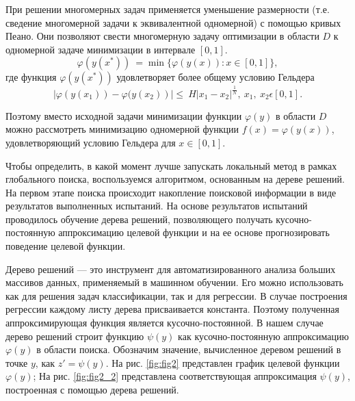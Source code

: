\documentclass[runningheads]{llncs}
\begin{document}
При решении многомерных задач применяется уменьшение размерности (т.е. сведение многомерной задачи к эквивалентной одномерной) с помощью кривых Пеано. Они позволяют свести многомерную задачу оптимизации в области $D$ к одномерной задаче минимизации в интервале $[0, 1]$.
\begin{displaymath}
	\varphi(y(x^\ast))\ =\min\{\varphi(y(x)): x\in [0,1]\},
\end{displaymath}
где функция $\varphi(y(x^\ast))$ удовлетворяет более общему условию Гельдера
\begin{displaymath}
	\left|\varphi (y \left(x_1\right))- \varphi (y \left(x_2\right)\right )|\le\ H\left|x_1-x_2\right|^\frac{1}{N},\ x_1,\ x_2\epsilon[0,1].
\end{displaymath} 

Поэтому вместо исходной задачи минимизации функции $\varphi(y)$ в области $D$ можно рассмотреть минимизацию одномерной функции $f(x)=\varphi(y(x)) $, удовлетворяющий условию Гельдера для $ x\in [0,1]$.


Чтобы определить, в какой момент лучше запускать локальный метод в рамках глобального поиска, воспользуемся алгоритмом, основанным на дереве решений. На первом этапе поиска происходит накопление поисковой информации в виде результатов выполненных испытаний. На основе результатов испытаний проводилось обучение дерева решений, позволяющего получать кусочно-постоянную аппроксимацию целевой функции и на ее основе прогнозировать поведение целевой функции. 

Дерево решений — это инструмент для автоматизированного анализа больших массивов данных, применяемый в машинном обучении. Его можно использовать как для решения задач классификации, так и для регрессии. В случае построения регрессии каждому листу дерева присваивается константа. Поэтому полученная аппроксимирующая функция является кусочно-постоянной. В нашем случае дерево решений строит функцию $\psi(y)$ как кусочно-постоянную аппроксимацию $\varphi(y)$ в области поиска. Обозначим значение, вычисленное деревом решений в точке $y$, как $z' = \psi(y)$.
На рис. \ref{fig:fig2} представлен график целевой функции $\varphi(y)$; На рис. \ref{fig:fig2_2} представлена соответствующая аппроксимация $\psi(y)$, построенная с помощью дерева решений.
\end{document}
